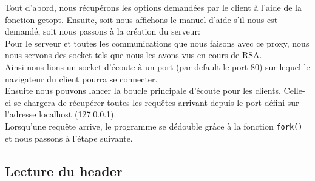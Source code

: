 \documentclass{scrreprt}
\def\code#1{\texttt{#1}}
\begin{document}
Tout d'abord, nous récupérons les options demandées par le client à l'aide de la fonction getopt. Ensuite, soit nous affichons le manuel d'aide s'il nous est demandé, soit nous passons à la création du serveur:\\
Pour le serveur et toutes les communications que nous faisons avec ce proxy, nous nous servons des socket tels que nous les avons vus en cours de RSA.\\
Ainsi nous lions un socket d'écoute à un port (par default le port 80) sur lequel le navigateur du client pourra se connecter.\\
Ensuite nous pouvons lancer la boucle principale d'écoute pour les clients. Celle-ci se chargera de récupérer toutes les requêtes arrivant depuis le port défini sur l'adresse localhost (127.0.0.1).\\
Lorsqu'une requête arrive, le programme se dédouble grâce à la fonction \code{fork()} et nous passons à l'étape suivante.

\subsection{Lecture du header}
\end{document}
